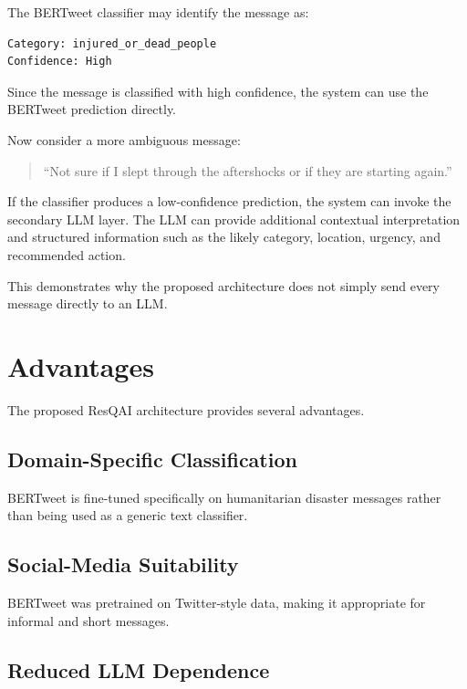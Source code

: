 \documentclass[12pt,a4paper]{article}
\begin{document}
The BERTweet classifier may identify the message as:

\begin{verbatim}
Category: injured_or_dead_people
Confidence: High
\end{verbatim}

Since the message is classified with high confidence, the system can use the
BERTweet prediction directly.

Now consider a more ambiguous message:

\begin{quote}
``Not sure if I slept through the aftershocks or if they are starting again.''
\end{quote}

If the classifier produces a low-confidence prediction, the system can invoke
the secondary LLM layer. The LLM can provide additional contextual
interpretation and structured information such as the likely category,
location, urgency, and recommended action.

This demonstrates why the proposed architecture does not simply send every
message directly to an LLM.

\section{Advantages}

The proposed ResQAI architecture provides several advantages.

\subsection{Domain-Specific Classification}

BERTweet is fine-tuned specifically on humanitarian disaster messages rather
than being used as a generic text classifier.

\subsection{Social-Media Suitability}

BERTweet was pretrained on Twitter-style data, making it appropriate for
informal and short messages.

\subsection{Reduced LLM Dependence}
\end{document}

